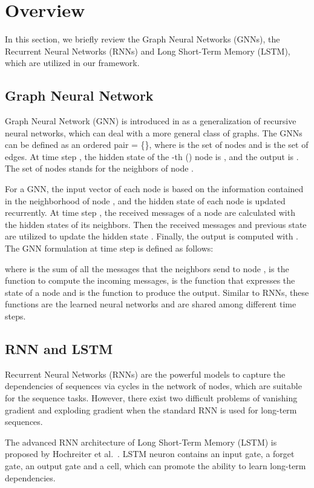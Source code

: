 \documentclass[runningheads]{llncs}
\begin{document}
\section{Overview}
\label{Overview}

In this section, we briefly review the Graph Neural Networks (GNNs), the Recurrent Neural Networks (RNNs) and Long Short-Term Memory (LSTM), which are utilized in our framework.

\subsection{Graph Neural Network}

Graph Neural Network (GNN) is introduced in \cite{Scarselli2009graph} as a generalization of recursive neural networks, which can deal with a more general class of graphs. The GNNs can be defined as an ordered pair  = \{\}, where  is the set of nodes and  is the set of edges. At time step , the hidden state of the -th () node is , and the output is . The set of nodes  stands for the neighbors of node .

For a GNN, the input vector of each node  is based on the information contained in the neighborhood of node , and the hidden state of each node is updated recurrently. At time step , the received messages of a node are calculated with the hidden states of its neighbors. Then the received messages and previous state  are utilized to update the hidden state . Finally, the output  is computed with . The GNN formulation at time step  is defined as follows:

where  is the sum of all the messages that the neighbors  send to node ,  is the function to compute the incoming messages,  is the function that expresses the state of a node and  is the function to produce the output. Similar to RNNs, these functions are the learned neural networks and are shared among different time steps.

\subsection{RNN and LSTM}

Recurrent Neural Networks (RNNs) are the powerful models to capture the dependencies of sequences via cycles in the network of nodes, which are suitable for the sequence tasks. However, there exist two difficult problems of vanishing gradient and exploding gradient when the standard RNN is used for long-term sequences.

The advanced RNN architecture of Long Short-Term Memory (LSTM) is proposed by Hochreiter et al.~\cite{Hochreiter1997lstm}. LSTM neuron contains an input gate, a forget gate, an output gate and a cell, which can promote the ability to learn long-term dependencies.
\end{document}
